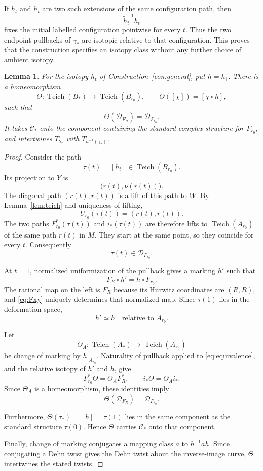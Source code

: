 \documentclass[11pt]{article}
\newcommand{\Teich}{\operatorname{Teich}}
\newcommand{\Def}{\mathcal D}
\newtheorem{lemma}[theorem]{Lemma}
\theoremstyle{definition}
\theoremstyle{remark}
\begin{document}
If $h_t$ and $\widetilde h_t$ are two such extensions of the same
configuration path, then
\[
\widetilde h_t^{-1}h_t
\]
fixes the initial labelled configuration pointwise for every $t$.
Thus the two endpoint pullbacks of $\gamma_*$ are isotopic relative
to that configuration.  This proves that the construction specifies
an isotopy class without any further choice of ambient isotopy.

\begin{lemma}\label{lem:transport}
For the isotopy $h_t$ of Construction~\ref{con:general}, put $h=h_1$.
There is a homeomorphism
\[
\Theta:\Teich(B_*)\longrightarrow\Teich(B_{r_0}),
\qquad
\Theta([\chi])=[\chi\circ h],
\]
such that
\[
\Theta(\Def_{F_R})=\Def_{F_{r_0}}.
\]
It takes $\mathcal C_*$ onto the component containing the standard
complex structure for $F_{r_0}$, and intertwines $T_{\gamma_*}$ with
$T_{h^{-1}(\gamma_*)}$.
\end{lemma}

\begin{proof}
Consider the path
\[
\tau(t)=[h_t]\in\Teich(B_{r_0}).
\]
Its projection to $Y$ is
\[
\bigl(r(t),\nu(r(t))\bigr).
\]
The diagonal path $(r(t),r(t))$ is a lift of this path to $W$.
By Lemma~\ref{lem:teich} and uniqueness of lifting,
\[
U_{r_0}(\tau(t))=(r(t),r(t)).
\]
The two paths $F_{r_0}^*(\tau(t))$ and $i_*(\tau(t))$ are therefore
lifts to $\Teich(A_{r_0})$ of the same path $r(t)$ in $M$.
They start at the same point, so they coincide for every $t$.
Consequently
\[
\tau(t)\in\Def_{F_{r_0}}.
\]

At $t=1$, normalized uniformization of the pullback gives a marking
$h'$ such that
\begin{equation}\label{eq:equivalence}
F_R\circ h'=h\circ F_{r_0}.
\end{equation}
The rational map on the left is $F_R$ because its Hurwitz coordinates
are $(R,R)$, and \eqref{eq:Fxy} uniquely determines that normalized
map.  Since $\tau(1)$ lies in the deformation space,
\[
h'\simeq h\quad\text{relative to }A_{r_0}.
\]

Let
\[
\Theta_A:\Teich(A_*)\longrightarrow\Teich(A_{r_0})
\]
be change of marking by $h|_{A_{r_0}}$.
Naturality of pullback applied to \eqref{eq:equivalence}, and the
relative isotopy of $h'$ and $h$, give
\[
F_{r_0}^*\Theta=\Theta_A F_R^*,
\qquad
i_*\Theta=\Theta_A i_*.
\]
Since $\Theta_A$ is a homeomorphism, these identities imply
\[
\Theta(\Def_{F_R})=\Def_{F_{r_0}}.
\]

Furthermore, $\Theta(\tau_*)=[h]=\tau(1)$ lies in the same component
as the standard structure $\tau(0)$.  Hence $\Theta$ carries
$\mathcal C_*$ onto that component.

Finally, change of marking conjugates a mapping class $a$ to
$h^{-1}ah$.  Since conjugating a Dehn twist gives the Dehn twist
about the inverse-image curve, $\Theta$ intertwines the stated
twists.
\end{proof}
\end{document}
